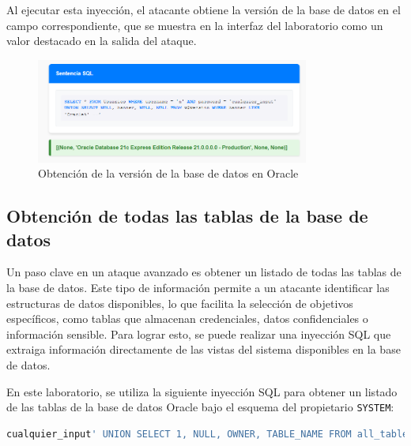 \documentclass[a4paper,12pt]{article}
\begin{document}
Al ejecutar esta inyección, el atacante obtiene la versión de la base de datos en el campo correspondiente, que se muestra en la interfaz del laboratorio como un valor destacado en la salida del ataque.

\begin{figure}[H]
    \centering
    \includegraphics[width=0.8\textwidth]{Imagenes/union4.png}
    \caption{Obtención de la versión de la base de datos en Oracle}
\end{figure}

\subsection{Obtención de todas las tablas de la base de datos}
Un paso clave en un ataque avanzado es obtener un listado de todas las tablas de la base de datos. Este tipo de información permite a un atacante identificar las estructuras de datos disponibles, lo que facilita la selección de objetivos específicos, como tablas que almacenan credenciales, datos confidenciales o información sensible. Para lograr esto, se puede realizar una inyección SQL que extraiga información directamente de las vistas del sistema disponibles en la base de datos.

En este laboratorio, se utiliza la siguiente inyección SQL para obtener un listado de las tablas de la base de datos Oracle bajo el esquema del propietario \texttt{SYSTEM}:

\begin{lstlisting}[language=SQL]
cualquier_input' UNION SELECT 1, NULL, OWNER, TABLE_NAME FROM all_tables WHERE OWNER='SYSTEM' -- AND password = 'cualquier_input'
\end{lstlisting}
\end{document}
